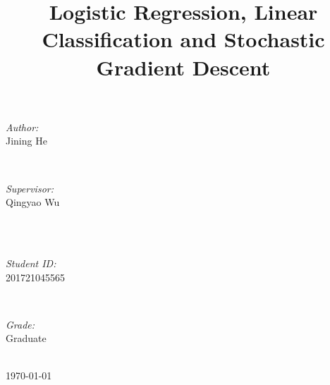 \documentclass[journal, a4paper]{IEEEtran}
\begin{document}
\begin{titlepage}
\begin{minipage}{0.4\textwidth}
\begin{flushleft} \large
\emph{Author:}\\
Jining He %
\end{flushleft}
\end{minipage}
~
\begin{minipage}{0.4\textwidth}
\begin{flushright} \large
\emph{Supervisor:} \\
Qingyao Wu %
\end{flushright}
\end{minipage}\\[2cm]
~
\begin{minipage}{0.4\textwidth}
\begin{flushleft} \large
\emph{Student ID:}\\
201721045565
\end{flushleft}
\end{minipage}
~
\begin{minipage}{0.4\textwidth}
\begin{flushright} \large
\emph{Grade:} \\
Graduate
\end{flushright}
\end{minipage}\\[2cm]



{\large \today}\\[2cm] %

 

\vfill %

\end{titlepage}

	\title{Logistic Regression, Linear Classification and Stochastic Gradient Descent}
	\maketitle
\end{document}
